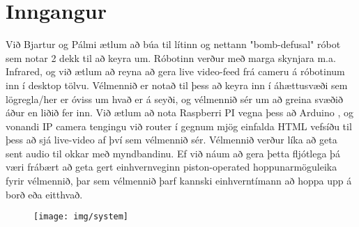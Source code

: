 \section{Inngangur}
Við Bjartur og Pálmi ætlum að búa til lítinn og nettann "bomb-defusal" róbot sem notar 2 dekk til að keyra um. Róbotinn verður með marga skynjara m.a. Infrared, og við ætlum að reyna að gera live video-feed frá cameru á róbotinum inn í desktop tölvu. Vélmennið er notað til þess að keyra inn í áhættusvæði sem lögregla/her er óviss um hvað er á seyði, og vélmennið sér um að greina svæðið áður en liðið fer inn. Við ætlum að nota Raspberri PI vegna þess að Arduino , og vonandi IP camera tengingu við router í gegnum mjög einfalda HTML vefsíðu til þess að sjá live-video af því sem vélmennið sér. Vélmennið verður líka að geta sent audio til okkar með myndbandinu. Ef við náum að gera þetta fljótlega þá væri frábært að geta gert einhvernveginn piston-operated hoppunarmöguleika fyrir vélmennið, þar sem vélmennið þarf kannski einhverntímann að hoppa upp á borð eða eitthvað.


\begin{figure}[h]
\texttt{[image: img/system]}
\end{figure}